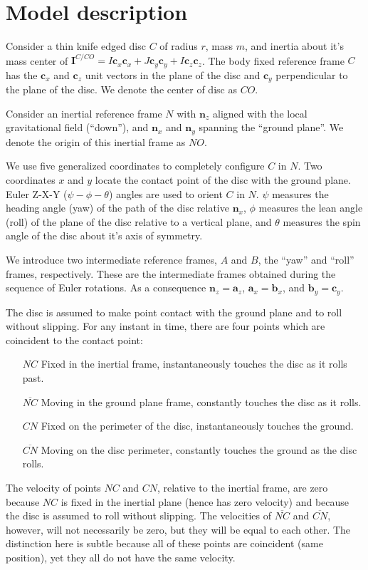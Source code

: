 \documentclass[letterpaper,11pt]{article}
\newcommand{\bs}[1]{\boldsymbol{#1}}
\begin{document}
\section{Model description}

Consider a thin knife edged disc $C$ of radius $r$, mass $m$, and inertia about
it's mass center of $\mathbf{I}^{C/CO} = I \bs{c}_x\bs{c}_x + J
\bs{c}_y\bs{c}_y + I \bs{c}_z\bs{c}_z$.  The body fixed reference frame $C$ has
the $\bs{c}_x$ and $\bs{c}_z$ unit vectors in the plane of the disc and
$\bs{c}_y$ perpendicular to the plane of the disc.  We denote the center of
disc as $CO$.

Consider an inertial reference frame $N$ with $\bs{n}_z$ aligned with the local
gravitational field (``down''), and $\bs{n}_x$ and $\bs{n}_y$ spanning the ``ground
plane''.  We denote the origin of this inertial frame as $NO$.

We use five generalized coordinates to completely configure $C$ in $N$.  Two
coordinates $x$ and $y$ locate the contact point of the disc with the ground
plane.  Euler Z-X-Y ($\psi-\phi-\theta$) angles are used to orient $C$ in
$N$.  $\psi$ measures the heading angle (yaw) of the path of the disc relative
$\bs{n}_x$, $\phi$ measures the lean angle (roll) of the plane of the disc
relative to a vertical plane, and $\theta$ measures the spin angle of the disc
about it's axis of symmetry.


We introduce two intermediate reference frames, $A$ and $B$, the ``yaw'' and
``roll'' frames, respectively.  These are the intermediate frames
obtained during the sequence of Euler rotations.  As a consequence $\bs{n}_z =
\bs{a}_z$, $\bs{a}_x = \bs{b}_x$, and $\bs{b}_y = \bs{c}_y$.

The disc is assumed to make point contact with the ground plane and to roll
without slipping.  For any instant in time, there are four points which are
coincident to the contact point:
\begin{itemize}
  \item[$NC$] Fixed in the inertial frame, instantaneously touches the disc as
    it rolls past.
  \item[$\overline{NC}$] Moving in the ground plane frame, constantly touches
    the disc as it rolls.
  \item[$CN$] Fixed on the perimeter of the disc, instantaneously touches the
    ground.
  \item[$\overline{CN}$] Moving on the disc perimeter, constantly touches the
    ground as the disc rolls.
\end{itemize}
The velocity of points $NC$ and $CN$, relative to the inertial frame,
are zero because $NC$ is fixed in the inertial plane (hence has zero velocity)
and because the disc is assumed to roll without slipping.  The velocities of
$\overline{NC}$ and $\overline{CN}$, however, will not necessarily be zero, but
they will be equal to each other.  The distinction here is subtle because all
of these points are coincident (same position), yet they all do not have the
same velocity.
\end{document}
